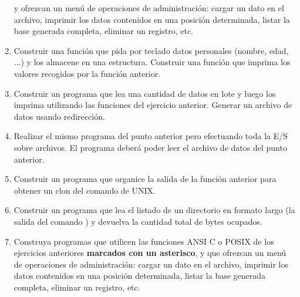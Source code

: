 \begin{enumerate}
y ofrezcan un menú de operaciones de administración: cargar un dato en el
archivo, imprimir los datos contenidos en una posición determinada, listar la
base generada completa, eliminar un registro, etc.
\item Construir una función que pida por teclado datos personales (nombre, edad, ...) y los almacene en una estructura. Construir una función que imprima los valores recogidos por la función anterior. 
\item Construir un programa que lea una cantidad de datos en lote y luego los imprima utilizando las funciones del ejercicio anterior. Generar un archivo de datos usando redirección.
\item Realizar el mismo programa del punto anterior pero efectuando toda la E/S sobre archivos. El programa deberá poder leer el archivo de datos del punto anterior.
\item Construir un programa que organice la salida de la función anterior para obtener un clon del comando  de UNIX.
\item Construir un programa que lea el listado de un directorio en formato largo (la salida del comando ) y devuelva la cantidad total de bytes ocupados.
\item Construya programas que utilicen las funciones ANSI C o POSIX de los ejercicios anteriores \textbf{marcados con un asterisco}, y que ofrezcan un menú de operaciones de administración: cargar un dato en el archivo, imprimir los datos contenidos en una posición determinada, listar la base generada completa, eliminar un registro, etc.
\end{enumerate}

